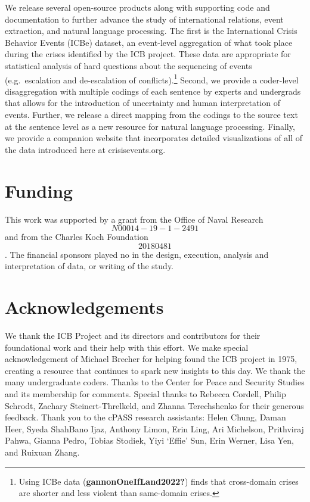 \documentclass{article}
\begin{document}
We release several open-source products along with supporting code and
documentation to further advance the study of international relations,
event extraction, and natural language processing. The first is the
International Crisis Behavior Events (ICBe) dataset, an event-level
aggregation of what took place during the crises identified by the ICB
project. These data are appropriate for statistical analysis of hard
questions about the sequencing of events (e.g.~escalation and
de-escalation of conflicts).\footnote{Using ICBe data
  (\textbf{gannonOneIfLand2022?}) finds that cross-domain crises are
  shorter and less violent than same-domain crises.} Second, we provide
a coder-level disaggregation with multiple codings of each sentence by
experts and undergrads that allows for the introduction of uncertainty
and human interpretation of events. Further, we release a direct mapping
from the codings to the source text at the sentence level as a new
resource for natural language processing. Finally, we provide a
companion website that incorporates detailed visualizations of all of
the data introduced here at crisisevents.org.

\hypertarget{funding}{%
\section{Funding}\label{funding}}

This work was supported by a grant from the Office of Naval Research
\[N00014-19-1-2491\] and from the Charles Koch Foundation \[20180481\].
The financial sponsors played no in the design, execution, analysis and
interpretation of data, or writing of the study.

\hypertarget{acknowledgements}{%
\section{Acknowledgements}\label{acknowledgements}}

We thank the ICB Project and its directors and contributors for their
foundational work and their help with this effort. We make special
acknowledgement of Michael Brecher for helping found the ICB project in
1975, creating a resource that continues to spark new insights to this
day. We thank the many undergraduate coders. Thanks to the Center for
Peace and Security Studies and its membership for comments. Special
thanks to Rebecca Cordell, Philip Schrodt, Zachary Steinert-Threlkeld,
and Zhanna Terechshenko for their generous feedback. Thank you to the
cPASS research assistants: Helen Chung, Daman Heer, Syeda ShahBano Ijaz,
Anthony Limon, Erin Ling, Ari Michelson, Prithviraj Pahwa, Gianna Pedro,
Tobias Stodiek, Yiyi `Effie' Sun, Erin Werner, Lisa Yen, and Ruixuan
Zhang.
\end{document}
